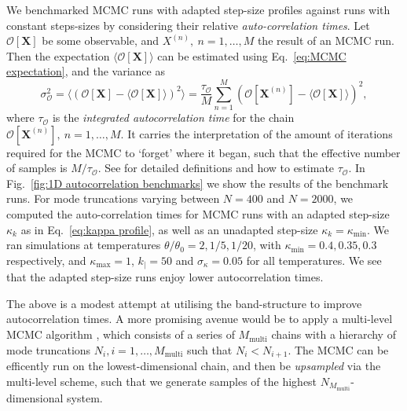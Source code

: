 We benchmarked MCMC runs with adapted step-size profiles against runs with constant steps-sizes by considering their relative \textit{auto-correlation times}. Let $\mathcal{O}[\mathbf{X}]$ be some observable, and $X^{(n)},\ n=1,\dots,M$ the result of an MCMC run. Then the expectation $\langle \mathcal{O}[\mathbf{X}] \rangle$ can be estimated using Eq.~\ref{eq:MCMC expectation}, and the variance as
\begin{equation} 
	\sigma^2_{\mathcal{O}} = \langle (\mathcal{O}[\mathbf{X}] - \langle \mathcal{O}[\mathbf{X}] \rangle)^2 \rangle = \frac{\tau_\mathcal{O}}{M} \sum_{n=1}^M (\mathcal{O}[\mathbf{X}^{(n)}] - \langle \mathcal{O}[\mathbf{X}] \rangle)^2,
\end{equation}
where $\tau_\mathcal{O}$ is the \textit{integrated autocorrelation time} for the chain $\mathcal{O}[\mathbf{X}^{(n)}],\ n=1,\dots,M$. It carries the interpretation of the amount of iterations required for the MCMC to `forget' where it began, such that the effective number of samples is $M/\tau_\mathcal{O}$. See \citep{sokalMonteCarloMethods1997, goodmanEnsembleSamplersAffine2010} for detailed definitions and how to estimate $\tau_\mathcal{O}$. In Fig.~\ref{fig:1D autocorrelation benchmarks} we show the results of the benchmark runs. For mode truncations varying between $N=400$ and $N=2000$, we computed the auto-correlation times for MCMC runs with an adapted step-size $\kappa_k$ as in Eq.~\ref{eq:kappa profile}, as well as an unadapted step-size $\kappa_k = \kappa_\text{min}$. We ran simulations at temperatures $\theta/\theta_0 = 2, 1/5,1/20$, with $\kappa_\text{min} = 0.4, 0.35, 0.3$ respectively, and $\kappa_\text{max}=1$, $k_| = 50$ and $\sigma_\kappa = 0.05$ for all temperatures. We see that the adapted step-size runs enjoy lower autocorrelation times.

The above is a modest attempt at utilising the band-structure to improve autocorrelation times. A more promising avenue would be to apply a multi-level MCMC algorithm \citep{gilesMultilevelMonteCarlo2008, dodwellHierarchicalMultilevelMarkov2015, jansenMultilevelMonteCarlo2020, rohrbachMultilevelSimulationHardsphere2022}, which consists of a series of $M_\text{multi}$ chains with a hierarchy of mode truncations $N_{i},i=1,\dots,M_\text{multi}$ such that $N_{i} < N_{i+1}$. The MCMC can be efficently run on the lowest-dimensional chain, and then be \textit{upsampled} via the multi-level scheme, such that we generate samples of the highest $N_{M_\text{multi}}$-dimensional system.





